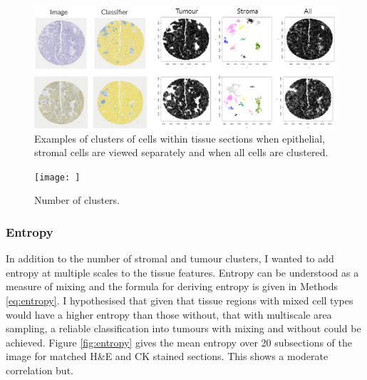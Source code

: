 \begin{figure}
    \centering
    \includegraphics[width=\textwidth]{Chapter3/Figs/dbscan_fullexample.png}
    \caption{Examples of clusters of cells within tissue sections when epithelial, stromal cells are viewed separately and when all cells are clustered.}
    \label{fig:dbclust}
\end{figure}

\begin{figure}
    \centering
    \texttt{[image: ]}
    \caption{Number of clusters.}
    \label{fig:dbscatter}
\end{figure}

\subsubsection*{Entropy}
In addition to the number of stromal and tumour clusters, I wanted to add entropy at multiple scales to the tissue features. Entropy can be understood as a measure of mixing and the formula for deriving entropy is given in Methods \ref{eq:entropy}. I hypothesised that given that tissue regions with mixed cell types would have a higher entropy than those without, that with multiscale area sampling, a reliable classification into tumours with mixing and without could be achieved. Figure \ref{fig:entropy} gives the mean entropy over 20 subsections of the image for matched H\&E and CK stained sections. This shows a moderate correlation but. 

